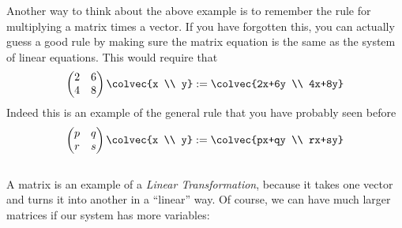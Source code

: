 Another way to think about the above example is to remember the rule for multiplying a matrix times a vector.
If you have forgotten this, you can actually  guess a good rule by making sure the matrix equation is the same as the system of linear equations.
This would require that
$$
 \begin{pmatrix}
      2     & 6 \\
      4     & 8
    \end{pmatrix}
  \colvec{x \\ y}
  :=   \colvec{2x+6y \\ 4x+8y}
$$
Indeed this is an example of
\hypertarget{ch1vecmult}{the general rule} that you have probably seen before
\begin{equation*}\label{2x2multiplication}
    \begin{pmatrix}
      p     & q  \\
      r      & s
    \end{pmatrix}
  \colvec{x \\ y}
  :=
  \colvec{px+qy \\ rx+sy}
\end{equation*}\\%
\noindent
A matrix is an example of a \emph{Linear Transformation}, because it takes one vector and turns it into another in a ``linear'' way.
Of course, we can have much larger matrices if our system has more variables:



